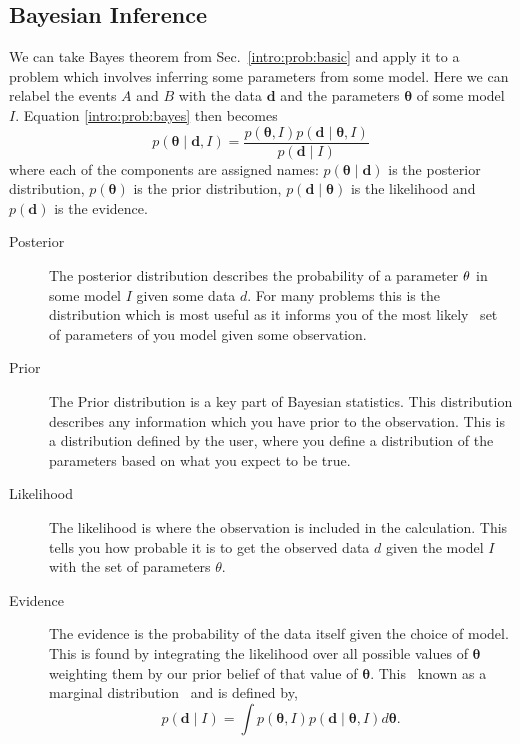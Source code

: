 \subsection{\label{intro:prob:bayes}Bayesian Inference}

We can take Bayes theorem from Sec.~\ref{intro:prob:basic} and apply it to a
problem which involves inferring some parameters from some model. Here we can
relabel the events $A$ and $B$ with the data ${\bm d}$ and the parameters ${\bm
\theta}$ of some model $I$.  Equation \ref{intro:prob:bayes} then becomes
%
\begin{equation}
\label{intro:bayes:bayes}
p({\bm \theta} \mid {\bm d}, I) = \frac{p({\bm \theta}, I)p({\bm d} \mid {\bm \theta}, I)}{p({\bm d} \mid I)}
\end{equation}
%
where each of the components are assigned names: $p({\bm \theta} \mid {\bm d})$
is the posterior distribution, $p({\bm \theta})$ is the prior distribution,
$p({\bm d} \mid {\bm \theta})$ is the likelihood and $p({\bm d})$ is the
evidence.

\begin{description}
	\item [Posterior]
        The posterior distribution describes the probability of a parameter
${\bf \theta}$ in some model $I$ given some data $d$. For many problems this is
the distribution which is most useful as it informs you of the most
likely~ set of
parameters of you model given some observation.
	
        \item [Prior] The Prior distribution is a key part of Bayesian
statistics. This distribution describes any information which you have prior to
the observation. This is a distribution defined by the user, where you define a
distribution of the parameters based on what you expect to be true.~
	
        \item [Likelihood] The likelihood is where the observation is included
in the calculation. This tells you how probable it is to get the observed data
$d$ given the model $I$ with the set of parameters $\theta$. 
	
        \item [Evidence] The evidence is the probability of the data itself
given the choice of model. This is found by integrating the likelihood over all
possible values of ${\bm \theta}$ weighting them by our prior belief of that
value of ${\bm \theta}$. This~ known as a marginal
distribution~ and is defined
by,
        \begin{equation} \label{intro:bayes:evidence} 
            p({\bm d} \mid I) = \int p({\bm \theta}, I)p({\bm d} \mid {\bm \theta}, I) d{\bm \theta}.
        \end{equation} 
\end{description}

